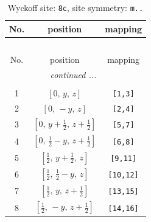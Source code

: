 \documentclass[fleqn,8pt]{jsarticle}
\begin{document}
\begin{longtable}{ccc}
\caption{Wyckoff site: {\tt 8c}, site symmetry: {\tt m..}}
 \\
 \hline \hline
No. & position & mapping \\ \hline \endfirsthead

\multicolumn{2}{l}{\tablename\ \thetable{}} \\
 \hline \hline
No. & position & mapping \\ \hline \endhead

 \hline \hline
\multicolumn{2}{r}{\footnotesize\it continued ...} \\ \endfoot

 \hline \hline
\multicolumn{2}{r}{} \\ \endlastfoot

1 & $\left[ 0,\, y,\, z \right]$ & {\tt [1,3]} \\ \hline
2 & $\left[ 0,\, - y,\, z \right]$ & {\tt [2,4]} \\ \hline
3 & $\left[ 0,\, y + \frac{1}{2},\, z + \frac{1}{2} \right]$ & {\tt [5,7]} \\ \hline
4 & $\left[ 0,\, \frac{1}{2} - y,\, z + \frac{1}{2} \right]$ & {\tt [6,8]} \\ \hline
5 & $\left[ \frac{1}{2},\, y + \frac{1}{2},\, z \right]$ & {\tt [9,11]} \\ \hline
6 & $\left[ \frac{1}{2},\, \frac{1}{2} - y,\, z \right]$ & {\tt [10,12]} \\ \hline
7 & $\left[ \frac{1}{2},\, y,\, z + \frac{1}{2} \right]$ & {\tt [13,15]} \\ \hline
8 & $\left[ \frac{1}{2},\, - y,\, z + \frac{1}{2} \right]$ & {\tt [14,16]} \\
\end{longtable}
\renewcommand{\arraystretch}{1.2}
\end{document}
